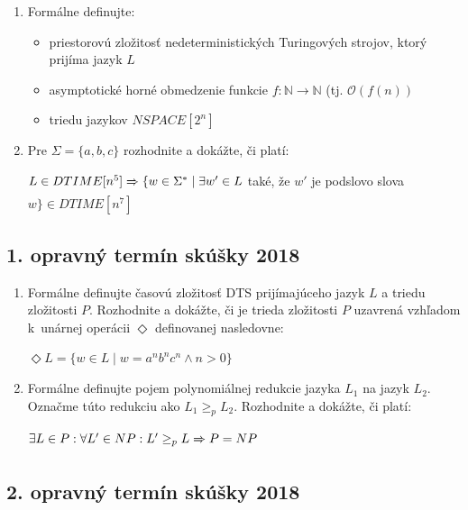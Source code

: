 \documentclass[11pt,a4paper]{article}
\begin{document}
		\begin{enumerate}
			\item Formálne definujte:

			\begin{itemize}
				\item priestorovú zložitosť nedeterministických Turingových strojov, ktorý prijíma jazyk $L$
				\item asymptotické horné obmedzenie funkcie $f: \mathbb{N} \rightarrow \mathbb{N}$ (tj. $\mathcal{O}(f(n))$
				\item triedu jazykov $NSPACE[2^n]$
			\end{itemize}

			\item Pre $\Sigma = \{a,b,c\}$ rozhodnite a dokážte, či platí:
	
			$L \in DTIME[n^5] \xRightarrow[]{} \{ w \in \Sigma^* \mid \exists w' \in L$ také, že $w'$ je podslovo slova $w\} \in DTIME[n^7]$
		\end{enumerate}	
	
		\subsection{1. opravný termín skúšky 2018}
		
		\begin{enumerate}
			\item Formálne definujte časovú zložitosť DTS prijímajúceho jazyk $L$ a triedu zložitosti $P$. Rozhodnite a dokážte, či je trieda zložitosti $P$ uzavrená vzhľadom k~unárnej operácii $\Diamond$ definovanej nasledovne:
			
			$\Diamond L = \{w \in L \mid w = a^nb^nc^n \land n > 0\}$
			
			\item Formálne definujte pojem polynomiálnej redukcie jazyka $L_1$ na jazyk $L_2$. Označme túto redukciu ako $L_1 \geq_p L_2$. Rozhodnite a dokážte, či platí:
			
			$\exists L \in P: \forall L' \in NP: L' \geq_p L \xRightarrow[]{} P = NP$
		\end{enumerate}
	
				\subsection{2. opravný termín skúšky 2018}
		
\end{document}
